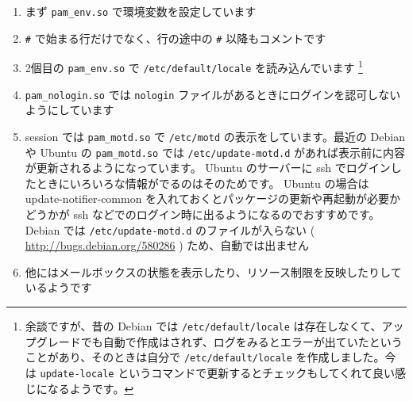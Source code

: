 \documentclass[mingoth,a4paper]{jsarticle}
\begin{document}
\begin{enumerate}
\item まず \verb~pam_env.so~ で環境変数を設定しています
\item \verb~#~ で始まる行だけでなく、行の途中の \verb~#~ 以降もコメントです
\item 2個目の \verb~pam_env.so~ で \verb~/etc/default/locale~ を読み込んでいます \footnote{余談ですが、昔の Debian では \verb~/etc/default/locale~ は存在しなくて、アップグレードでも自動で作成はされず、ログをみるとエラーが出ていたということがあり、そのときは自分で \verb~/etc/default/locale~ を作成しました。今は \verb~update-locale~ というコマンドで更新するとチェックもしてくれて良い感じになるようです。 }
\item \verb~pam_nologin.so~ では \verb~nologin~ ファイルがあるときにログインを認可しないようにしています
\item session では \verb~pam_motd.so~ で \verb~/etc/motd~ の表示をしています。最近の Debian や Ubuntu の \verb~pam_motd.so~ では \verb~/etc/update-motd.d~ があれば表示前に内容が更新されるようになっています。 Ubuntu のサーバーに ssh でログインしたときにいろいろな情報がでるのはそのためです。 Ubuntu の場合は update-notifier-common を入れておくとパッケージの更新や再起動が必要かどうかが ssh などでのログイン時に出るようになるのでおすすめです。 Debian では \verb~/etc/update-motd.d~ のファイルが入らない ( \href{http://bugs.debian.org/580286}{http://bugs.debian.org/580286} ) ため、自動では出ません
\item 他にはメールボックスの状態を表示したり、リソース制限を反映したりしているようです
\end{enumerate}
\end{document}
